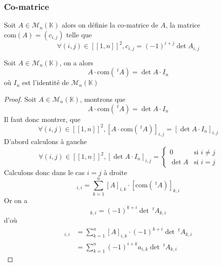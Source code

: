 \documentclass[11pt,colorlinks]{book}
\theoremstyle{mytheoremstyle}
\theoremstyle{mytheoremstyle}
\theoremstyle{mytheoremstyle}
\theoremstyle{mytheoremstyle}
\theoremstyle{mytheoremstyle}
\theoremstyle{mytheoremstyle}
\theoremstyle{mytheoremstyle}
\theoremstyle{mytheoremstyle}
\theoremstyle{myproblemstyle}
\def\mbb#1{\mathbb{#1}}
\def\bK{\mbb{K}}
\begin{document}
\subsubsection{Co-matrice}
\begin{definition}
  Soit $A \in \mathcal{M}_n(\bK)$ alors on définie la co-matrice de $A$, la matrice $\text{com}(A) = (c_{i,j})$ telle que 
  \begin{equation*}
    \forall (i,j) \in [\![1,n]\!]^2, c_{i,j} = (-1)^{i+j} \det A_{i,j}
  \end{equation*}
\end{definition}
\begin{prop}
  Soit $A \in \mathcal{M}_n(\bK)$, on a alors 
  \begin{equation*}
    A \cdot \text{com}(~^tA) = \det A\cdot I_n
  \end{equation*}
  où $I_n$ est l'identité de $\mathcal{M}_n(\bK)$
  \begin{proof}
    Soit $A \in \mathcal{M}_n(\bK)$, montrons que
    \begin{equation*}
      A \cdot \text{com}(~^tA) = \det A\cdot I_n
    \end{equation*}
    Il faut donc montrer, que 
    \begin{equation*}
      \forall (i,j) \in [\![1,n]\!]^2, [A\cdot \text{com}(~^tA)]_{i,j} = [\det A\cdot I_n]_{i,j}
    \end{equation*}
    D'abord calculons à gauche
    \begin{equation*}
      \forall (i,j) \in [\![1,n]\!]^2, [\det A\cdot I_n]_{i,j} = \begin{cases}
        0 & \text{si } i \not= j \\ 
        \det A & \text{si } i=j
      \end{cases}
    \end{equation*}
    Calculons donc dans le cas $i=j$ à droite 
    \begin{equation*}
      [A\cdot \text{com}(~^tA)]_{i,i} = \sum_{k=1}^n [A]_{i,k} \cdot [\text{com}(~^tA)]_{k,i}
    \end{equation*}
    Or on a 
    \begin{equation*}
      [\text{com}(~^tA)]_{k,i} = (-1)^{k+i} \det ~^tA_{k,i}
    \end{equation*}
    d'où
    \begin{align*}
      [A\cdot \text{com}(~^tA)]_{i,i} &= \sum_{k=1}^n [A]_{i,k} \cdot (-1)^{k+i} \det ~^tA_{k,i} \\ 
      &= \sum_{k=1}^n (-1)^{i+k} a_{i,k} \det ~^tA_{k,i} 

\end{align*}
\end{proof}
\end{prop}
\end{document}
